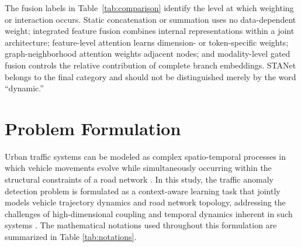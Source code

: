 \documentclass[journal]{IEEEtran}
\begin{document}
The fusion labels in Table~\ref{tab:comparison} identify the level at which weighting or interaction occurs. Static concatenation or summation uses no data-dependent weight; integrated feature fusion combines internal representations within a joint architecture; feature-level attention learns dimension- or token-specific weights; graph-neighborhood attention weights adjacent nodes; and modality-level gated fusion controls the relative contribution of complete branch embeddings. STANet belongs to the final category and should not be distinguished merely by the word ``dynamic.''

\FloatBarrier

\section{Problem Formulation}

Urban traffic systems can be modeled as complex spatio-temporal processes in which vehicle movements evolve while simultaneously occurring within the structural constraints of a road network \cite{zhang_automatic_2022, zhang_traffic_2025}. In this study, the traffic anomaly detection problem is formulated as a context-aware learning task that jointly models vehicle trajectory dynamics and road network topology, addressing the challenges of high-dimensional coupling and temporal dynamics inherent in such systems \cite{ren_graph_2024}. The mathematical notations used throughout this formulation are summarized in Table \ref{tab:notations}.
\end{document}
